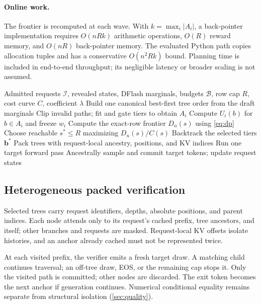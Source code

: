 \documentclass{article}
\newcommand{\method}{\textsc{SpecGrove}\xspace}
\begin{document}
\paragraph{Online work.}
The frontier is recomputed at each wave. With $k=\max_i|A_i|$, a back-pointer implementation requires $O(nRk)$ arithmetic operations, $O(R)$ reward memory, and $O(nR)$ back-pointer memory. The evaluated Python path copies allocation tuples and has a conservative $O(n^2Rk)$ bound. Planning time is included in end-to-end throughput; its negligible latency or broader scaling is not assumed.

\begin{algorithm}[tbp]
\caption{One \method verification wave}
\label{alg:wave}
\begin{algorithmic}[1]
\Require Admitted requests $\mathcal I$, revealed states, DFlash marginals, budgets $\mathcal B$, row cap $R$, cost curve $C$, coefficient $\lambda$
  \State Build one canonical best-first tree order from the draft marginals
  \State Clip invalid paths; fit and gate tiers to obtain $A_i$
  \State Compute $U_i(b)$ for $b\in A_i$ and freeze $w_i$
\EndFor
\State Compute the exact-row frontier $D_n(s)$ using \cref{eq:dp}
\State Choose reachable $s^*\le R$ maximizing $D_n(s)/C(s)$
\State Backtrack the selected tiers $\boldsymbol b^*$
\State Pack trees with request-local ancestry, positions, and KV indices
\State Run one target forward pass
\State Ancestrally sample and commit target tokens; update request states
\end{algorithmic}
\end{algorithm}

\subsection{Heterogeneous packed verification}
\label{sec:packing}
Selected trees carry request identifiers, depths, absolute positions, and parent indices. Each node attends only to its request's cached prefix, tree ancestors, and itself; other branches and requests are masked. Request-local KV offsets isolate histories, and an anchor already cached must not be represented twice.

At each visited prefix, the verifier emits a fresh target draw. A matching child continues traversal; an off-tree draw, EOS, or the remaining cap stops it. Only the visited path is committed; other nodes are discarded. The exit token becomes the next anchor if generation continues. Numerical conditional equality remains separate from structural isolation (\cref{sec:quality}).
\end{document}
